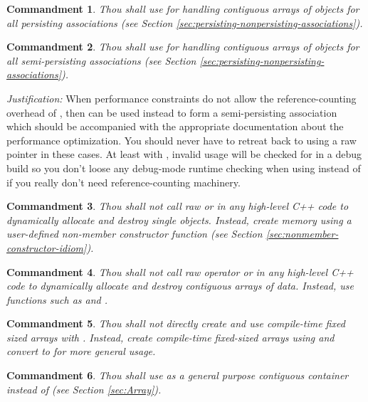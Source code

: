 \documentclass[pdf,ps2pdf,11pt]{SANDreport}
\newtheorem{commandment}{Commandment}
\begin{document}
\begin{commandment}
Thou shall use {} for handling contiguous arrays of
objects for all persisting associations (see Section
{}\ref{sec:persisting-nonpersisting-associations}).
\end{commandment}

\begin{commandment}\label{cmnd:arrayview-semi-persisting}
Thou shall use {} for handling contiguous arrays of
objects for all semi-persisting associations (see Section
{}\ref{sec:persisting-nonpersisting-associations}).
\end{commandment}
{}\textit{Justification:} When performance constraints do not allow
the reference-counting overhead of {}, then
{} can be used instead to form a semi-persisting
association which should be accompanied with the appropriate
documentation about the performance optimization.  You should never
have to retreat back to using a raw pointer in these cases.  At least
with {}, invalid usage will be checked for in a
debug build so you don't loose any debug-mode runtime checking when
using {} instead of {} if you
really don't need reference-counting machinery.

\begin{commandment}
Thou shall not call raw {} or {} in any
high-level C++ code to dynamically allocate and destroy single
objects.  Instead, create memory using a user-defined non-member
constructor function (see Section
{}\ref{sec:nonmember-constructor-idiom}).
\end{commandment}

\begin{commandment}
Thou shall not call raw operator {} or {} in any high-level C++ code to dynamically allocate and destroy
contiguous arrays of data.  Instead, use functions such as
{} and {}.
\end{commandment}

\begin{commandment}
Thou shall not directly create and use compile-time fixed sized arrays
with {}.  Instead, create compile-time fixed-sized arrays
using {} and convert to
{} for more general usage.
\end{commandment}

\begin{commandment}
Thou shall use {} as a general purpose
contiguous container instead of {} (see Section
{}\ref{sec:Array}).
\end{commandment}
\end{document}
